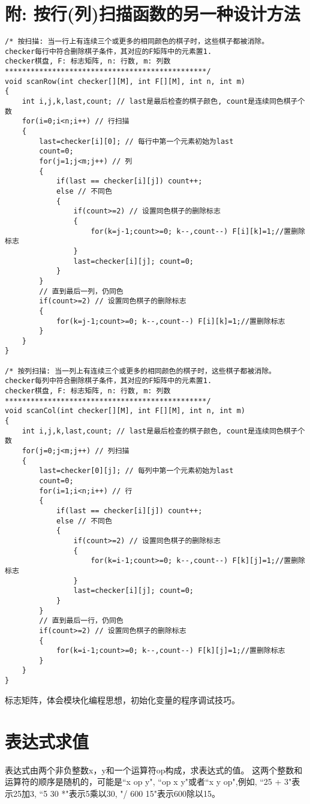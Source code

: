 \section*{附: 按行(列)扫描函数的另一种设计方法}

\begin{lstlisting}
/* 按扫描: 当一行上有连续三个或更多的相同颜色的棋子时，这些棋子都被消除。
checker每行中符合删除棋子条件，其对应的F矩阵中的元素置1. 
checker棋盘, F: 标志矩阵, n: 行数, m: 列数
***********************************************/ 
void scanRow(int checker[][M], int F[][M], int n, int m)
{
	int i,j,k,last,count; // last是最后检查的棋子颜色, count是连续同色棋子个数 
	for(i=0;i<n;i++) // 行扫描 
	{
		last=checker[i][0]; // 每行中第一个元素初始为last
		count=0; 
		for(j=1;j<m;j++) // 列 
		{
			if(last == checker[i][j]) count++;
			else // 不同色
			{
				if(count>=2) // 设置同色棋子的删除标志 
				{
					for(k=j-1;count>=0; k--,count--) F[i][k]=1;//置删除标志 
				}
				last=checker[i][j]; count=0;  
			} 
		}
		// 直到最后一列，仍同色 
		if(count>=2) // 设置同色棋子的删除标志 
		{
			for(k=j-1;count>=0; k--,count--) F[i][k]=1;//置删除标志 
		} 
	}	
}

/* 按列扫描: 当一列上有连续三个或更多的相同颜色的棋子时，这些棋子都被消除。
checker每列中符合删除棋子条件，其对应的F矩阵中的元素置1. 
checker棋盘, F: 标志矩阵, n: 行数, m: 列数
***********************************************/ 
void scanCol(int checker[][M], int F[][M], int n, int m)
{
	int i,j,k,last,count; // last是最后检查的棋子颜色, count是连续同色棋子个数 
	for(j=0;j<m;j++) // 列扫描 
	{
		last=checker[0][j]; // 每列中第一个元素初始为last
		count=0; 
		for(i=1;i<n;i++) // 行 
		{
			if(last == checker[i][j]) count++;
			else // 不同色
			{
				if(count>=2) // 设置同色棋子的删除标志 
				{
					for(k=i-1;count>=0; k--,count--) F[k][j]=1;//置删除标志 
				}
				last=checker[i][j]; count=0;  
			} 
		}
		// 直到最后一行，仍同色 
		if(count>=2) // 设置同色棋子的删除标志 
		{
			for(k=i-1;count>=0; k--,count--) F[k][j]=1;//置删除标志 
		} 
	}	
}
\end{lstlisting}

\begin{note}[要点]
	标志矩阵，体会模块化编程思想，初始化变量的程序调试技巧。
\end{note}

\section{表达式求值}
表达式由两个非负整数x，y和一个运算符op构成，求表达式的值。
这两个整数和运算符的顺序是随机的，可能是``x op y", ``op x y"或者``x y op",例如, ``25 + 3"表示25加3, ``5 30 *"表示5乘以30, "/ 600 15"表示600除以15。

